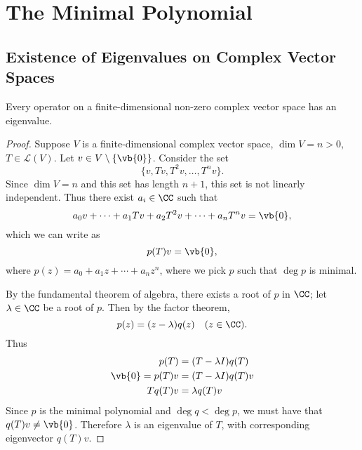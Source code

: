 \section{The Minimal Polynomial}
\subsection{Existence of Eigenvalues on Complex Vector Spaces}
\begin{theorem}
Every operator on a finite-dimensional non-zero complex vector space has an eigenvalue.
\end{theorem}

\begin{proof}
Suppose $V$ is a finite-dimensional complex vector space, $\dim V=n>0$, $T\in\mathcal{L}(V)$. Let $v\in V\setminus\{\vb{0}\}$. Consider the set
\[\{v,Tv,T^2v,\dots,T^nv\}.\]
Since $\dim V=n$ and this set has length $n+1$, this set is not linearly independent. Thus there exist $a_i\in\CC$ such that
\[a_0v+\cdots+a_1Tv+a_2T^2v+\cdots+a_nT^nv=\vb{0},\]
which we can write as
\[p(T)v=\vb{0},\]
where $p(z)=a_0+a_1z+\cdots+a_nz^n$, where we pick $p$ such that $\deg p$ is minimal.

By the fundamental theorem of algebra, there exists a root of $p$ in $\CC$; let $\lambda\in\CC$ be a root of $p$. Then by the factor theorem,
\[p(z)=(z-\lambda)q(z)\quad(z\in\CC).\]
Thus
\begin{align*}
p(T)&=(T-\lambda I)q(T)\\
\vb{0}=p(T)v&=(T-\lambda I)q(T)v\\
Tq(T)v&=\lambda q(T)v
\end{align*}
Since $p$ is the minimal polynomial and $\deg q<\deg p$, we must have that $q(T)v\neq\vb{0}$. Therefore $\lambda$ is an eigenvalue of $T$, with corresponding eigenvector $q(T)v$.
\end{proof}


